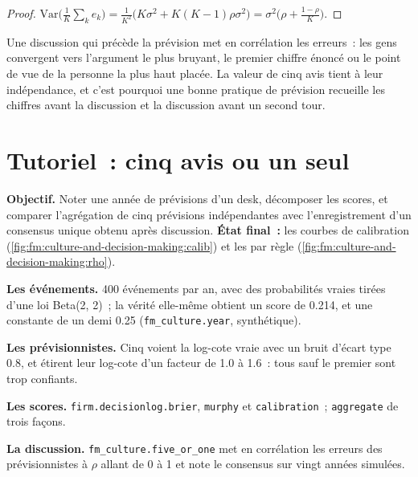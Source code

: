 \begin{proof}
$\mathrm{Var}\bigl(\frac1K\sum_ke_k\bigr)=\frac1{K^2}\bigl(K\sigma^2+K(K-1)\rho\sigma^2\bigr)=\sigma^2\bigl(\rho+\frac{1-\rho}K\bigr)$.
\end{proof}

Une discussion qui précède la prévision met en corrélation les erreurs~: les gens convergent vers l'argument le plus bruyant, le premier chiffre énoncé ou le point de vue de la personne
la plus haut placée. La valeur de cinq avis tient à leur indépendance, et c'est pourquoi une bonne pratique de prévision recueille les chiffres avant la discussion
et la discussion avant un second tour.

\section{Tutoriel~: cinq avis ou un seul}\label{tut:fm:culture-and-decision-making:tut}

\begin{tutorial}
\textbf{Objectif.} Noter une année de prévisions d'un desk, décomposer les scores, et comparer l'agrégation de cinq prévisions indépendantes avec l'enregistrement d'un consensus unique
obtenu après discussion. \textbf{État final~:} les courbes de calibration (\cref{fig:fm:culture-and-decision-making:calib}) et les  par règle
(\cref{fig:fm:culture-and-decision-making:rho}).
\begin{tutsteps}
\item \textbf{Les événements.} 400 événements par an, avec des probabilités vraies tirées d'une loi Beta(2, 2)~; la vérité elle-même obtient un score de 0.214, et une constante
de un demi 0.25 (\texttt{fm\_culture.year}, synthétique).
\item \textbf{Les prévisionnistes.} Cinq voient la log-cote vraie avec un bruit d'écart type 0.8, et étirent leur log-cote d'un facteur de 1.0 à 1.6~: tous
sauf le premier sont trop confiants.
\item \textbf{Les scores.} \texttt{firm.decisionlog.brier}, \texttt{murphy} et \texttt{calibration}~; \texttt{aggregate} de trois façons.
\item \textbf{La discussion.} \texttt{fm\_culture.five\_or\_one} met en corrélation les erreurs des prévisionnistes à $\rho$ allant de 0 à 1 et note le consensus
sur vingt années simulées.
\end{tutsteps}
\end{tutorial}


